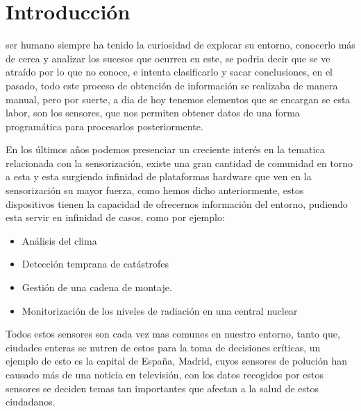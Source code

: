 \chapter{Introducción}



 ser humano siempre ha tenido la curiosidad de explorar su entorno,
conocerlo más de cerca y analizar los sucesos que ocurren en este, se podria
decir que se ve atraído por lo que no conoce, e intenta clasificarlo y sacar
conclusiones, en el pasado, todo este proceso de obtención de información se
realizaba de manera manual, pero por suerte, a dia de hoy tenemos elementos que
se encargan se esta labor, son los sensores, que nos permiten obtener datos de
una forma programática para procesarlos posteriormente.

En los últimos años podemos presenciar un creciente interés en la
tematica relacionada con la sensorización, existe una gran cantidad de
comunidad en torno a esta y esta surgiendo infinidad de plataformas hardware que
ven en la sensorización su mayor fuerza, como hemos dicho anteriormente, estos
dispositivos tienen la capacidad de ofrecernos información del entorno, pudiendo
esta servir en infinidad de casos, como por ejemplo: 
\begin{itemize}
\item Análisis del clima
\item Detección temprana de catástrofes
\item Gestión de una cadena de montaje.
\item Monitorización de los niveles de radiación en una central nuclear
\end{itemize}

Todos estos sensores son cada vez mas comunes en nuestro entorno, tanto que, ciudades enteras se
nutren de estos para la toma de decisiones críticas, un ejemplo de esto es la
capital de España, Madrid, cuyos sensores de polución han causado más de una
noticia en televisión, con los datos recogidos por estos sensores se deciden
temas tan importantes que afectan a la salud de estos ciudadanos.

